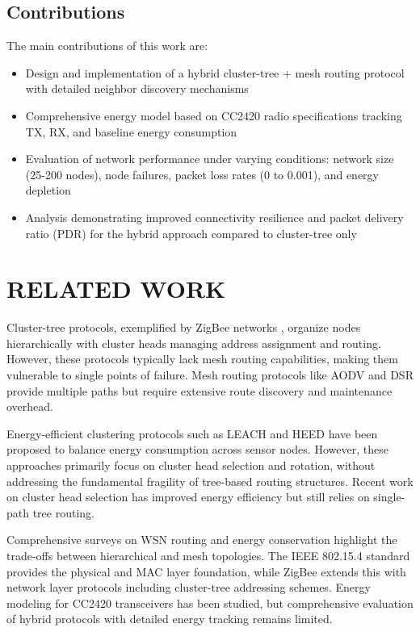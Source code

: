 \documentclass[conference]{IEEEtran}
\begin{document}
\subsection{Contributions}
The main contributions of this work are:
\begin{itemize}
    \item Design and implementation of a hybrid cluster-tree + mesh routing protocol with detailed neighbor discovery mechanisms
    \item Comprehensive energy model based on CC2420 radio specifications tracking TX, RX, and baseline energy consumption
    \item Evaluation of network performance under varying conditions: network size (25-200 nodes), node failures, packet loss rates (0 to 0.001), and energy depletion
    \item Analysis demonstrating improved connectivity resilience and packet delivery ratio (PDR) for the hybrid approach compared to cluster-tree only
\end{itemize}

\section{RELATED WORK}

Cluster-tree protocols, exemplified by ZigBee networks \cite{b1,b2}, organize nodes hierarchically with cluster heads managing address assignment and routing. However, these protocols typically lack mesh routing capabilities, making them vulnerable to single points of failure. Mesh routing protocols like AODV \cite{b3} and DSR \cite{b4} provide multiple paths but require extensive route discovery and maintenance overhead.

Energy-efficient clustering protocols such as LEACH \cite{b12} and HEED \cite{b13} have been proposed to balance energy consumption across sensor nodes. However, these approaches primarily focus on cluster head selection and rotation, without addressing the fundamental fragility of tree-based routing structures. Recent work on cluster head selection \cite{b5,b6,b7} has improved energy efficiency but still relies on single-path tree routing.

Comprehensive surveys on WSN routing \cite{b15,b16} and energy conservation \cite{b18} highlight the trade-offs between hierarchical and mesh topologies. The IEEE 802.15.4 standard \cite{b1} provides the physical and MAC layer foundation, while ZigBee \cite{b2} extends this with network layer protocols including cluster-tree addressing schemes. Energy modeling for CC2420 transceivers \cite{b8,b9} has been studied, but comprehensive evaluation of hybrid protocols with detailed energy tracking remains limited.
\end{document}
